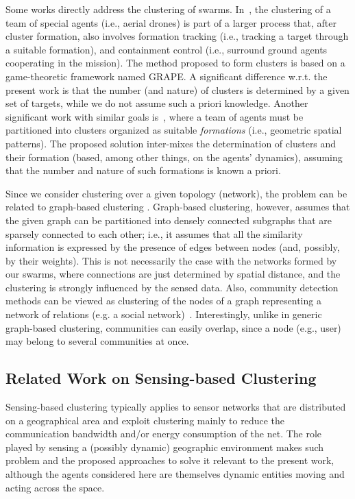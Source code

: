 Some works directly address the clustering of swarms. In~\cite{DBLP:journals/trob/HuBJAL21}, the clustering of a team of special agents (i.e., aerial drones) is part of a larger process that,
 after cluster formation, also involves formation tracking (i.e., tracking a target through a suitable formation), and containment control (i.e., surround ground agents cooperating in the mission).
 The method proposed to form clusters is based on a game-theoretic framework named GRAPE. A significant difference w.r.t. the present work is that the number (and nature) of clusters is determined by a given set of targets,
 while we do not assume such a priori knowledge.
Another significant work with similar goals is~\cite{DBLP:journals/tie/GeHZ18}, where a team of agents must be partitioned into clusters organized as suitable {\em formations} (i.e., geometric spatial patterns).
 The proposed solution inter-mixes the determination of clusters and their formation (based, among other things, on the agents' dynamics), assuming that the number and nature of such formations is known a priori.

Since we consider clustering over a given topology (network), the problem can be related to graph-based clustering \cite{Zheng:2010}.
Graph-based clustering, however, assumes that the given graph can be partitioned into densely connected subgraphs that are sparsely connected to each other; i.e.,
it assumes that all the similarity information is expressed by the presence of edges between nodes (and, possibly, by their weights).
This is not necessarily the case with the networks formed by our swarms, where connections are just determined by spatial distance, and the clustering is strongly influenced by the sensed data.
Also, community detection methods can be viewed as clustering of the nodes of a graph representing a network of relations (e.g. a social network)~\cite{DBLP:journals/jnca/JavedYLQB18}.
Interestingly, unlike in generic graph-based clustering, communities can easily overlap, since a node (e.g., user) may belong to several communities at once.

\subsection{Related Work on Sensing-based Clustering}
\label{s:rw:related-sensingbased-clustering}

Sensing-based clustering typically applies to sensor networks that are distributed on a geographical area and exploit clustering mainly to reduce the communication bandwidth and/or energy consumption of the net.
 The role played by sensing a (possibly dynamic) geographic environment makes such problem and the proposed approaches to solve it relevant to the present work,
 although the agents considered here are themselves dynamic entities moving and acting across the space.

